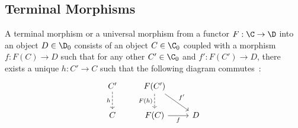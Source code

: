 \subsection*{Terminal Morphisms}

\begin{definition}
	A terminal morphism or a universal morphism from a functor $F: \C \to \D$ into
	an object $D\in \D_0$ consists of an object $C\in \C_0$ coupled with a
	morphism $f: F(C) \to D$ such that for any other $C'\in \C_0$ and $f': F(C')
	\to D$, there exists a unique $h:C' \to C$ such that the following diagram
	commutes~\parencite[p.~58]{lane:working_mathematician}:
	\[\begin{tikzcd}[ampersand replacement=\&]
		{C'} \& {F(C')} \\
		C \& {F(C)} \& D
		\arrow["{F(h)}"', dashed, from=1-2, to=2-2]
		\arrow["{f'}", from=1-2, to=2-3]
		\arrow["f"', from=2-2, to=2-3]
		\arrow["h"', dashed, from=1-1, to=2-1]
	\end{tikzcd}\]
\end{definition}

